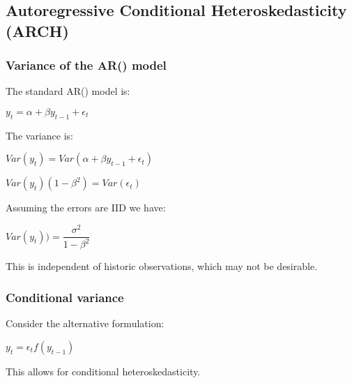 
\subsection{Autoregressive Conditional Heteroskedasticity (ARCH)}

\subsubsection{Variance of the AR(\1\)) model}

The standard AR(\1\)) model is:

\(y_t=\alpha + \beta y_{t-1}+\epsilon_t \)

The variance is:

\(Var(y_t)=Var(\alpha + \beta y_{t-1}+\epsilon_t)\)

\(Var(y_t)(1-\beta^2)=Var(\epsilon_t)\)

Assuming the errors are IID we have:

\(Var(y_t))=\dfrac{\sigma^2 }{1-\beta^2 }\)

This is independent of historic observations, which may not be desirable.

\subsubsection{Conditional variance}

Consider the alternative formulation:

\(y_t=\epsilon_t f(y_{t-1})\)

This allows for conditional heteroskedasticity.

